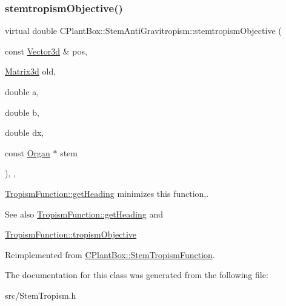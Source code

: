 \subsubsection{\texorpdfstring{stemtropism\+Objective()}{stemtropismObjective()}}
{\footnotesize\ttfamily virtual double C\+Plant\+Box\+::\+Stem\+Anti\+Gravitropism\+::stemtropism\+Objective (\begin{DoxyParamCaption}\item[{const \hyperlink{classCPlantBox_1_1Vector3d}{Vector3d} \&}]{pos,  }\item[{\hyperlink{classCPlantBox_1_1Matrix3d}{Matrix3d}}]{old,  }\item[{double}]{a,  }\item[{double}]{b,  }\item[{double}]{dx,  }\item[{const \hyperlink{classCPlantBox_1_1Organ}{Organ} $\ast$}]{stem }\end{DoxyParamCaption})\hspace{0.3cm}{\ttfamily [inline]}, {\ttfamily [override]}, {\ttfamily [virtual]}}



\hyperlink{classCPlantBox_1_1TropismFunction_adb52b88734a94fe1365a00e02c7e6be5}{Tropism\+Function\+::get\+Heading} minimizes this function,. 

\begin{DoxySeeAlso}{See also}
\hyperlink{classCPlantBox_1_1TropismFunction_adb52b88734a94fe1365a00e02c7e6be5}{Tropism\+Function\+::get\+Heading} and 

\hyperlink{classCPlantBox_1_1TropismFunction_a4f2c79fff55d1398c98a070dd8ebbe08}{Tropism\+Function\+::tropism\+Objective} 
\end{DoxySeeAlso}


Reimplemented from \hyperlink{classCPlantBox_1_1StemTropismFunction_a86dc37330cbec72042352dcce88756ae}{C\+Plant\+Box\+::\+Stem\+Tropism\+Function}.



The documentation for this class was generated from the following file\+:\begin{DoxyCompactItemize}
\item 
src/Stem\+Tropism.\+h\end{DoxyCompactItemize}
